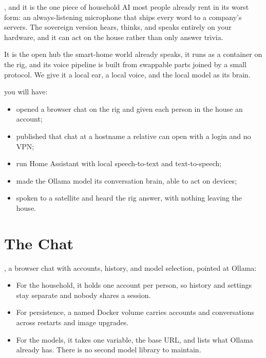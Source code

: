 , and it is the one piece of household AI
most people already rent in its worst form: an always-listening microphone that
ships every word to a company's servers. The sovereign version hears, thinks, and
speaks entirely on your hardware, and it can act on the house rather than only
answer trivia.

 It is the open hub the smart-home
world already speaks, it runs as a container on the rig, and its voice pipeline is
built from swappable parts joined by a small protocol. We give it a local ear, a
local voice, and the local model as its brain.

 you will have:
\begin{itemize}
    \item opened a browser chat on the rig and given each person in the house an account;
    \item published that chat at a hostname a relative can open with a login and no VPN;
    \item run Home Assistant with local speech-to-text and text-to-speech;
    \item made the Ollama model its conversation brain, able to act on devices;
    \item spoken to a satellite and heard the rig answer, with nothing leaving the house.
\end{itemize}


\section{The Chat}

, a browser chat with accounts, history,
and model selection, pointed at Ollama\cite{openwebuiRepo}:

\begin{itemize}[topsep=0.25em, itemsep=0.4em, parsep=0em]
    \item For the household, it holds one account per person, so history and
    settings stay separate and nobody shares a session.
    \item For persistence, a named Docker volume carries accounts and
    conversations across restarts and image upgrades.
    \item For the models, it takes one variable, the base URL, and lists what
    Ollama already has. There is no second model library to maintain.
\end{itemize}


